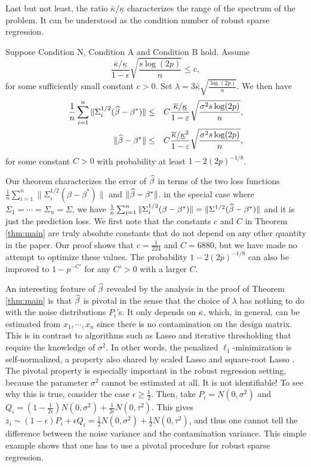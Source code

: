 Last but not least, the ratio $\overline{\kappa}/\underline{\kappa}$ characterizes the range of the spectrum of the problem. It can be understood as the condition number of robust sparse regression.

\begin{thm}\label{thm:main}
Suppose Condition N, Condition A and Condition B hold. Assume
$$\frac{\overline{\kappa}/\underline{\kappa}}{1-\epsilon}\sqrt{\frac{s\log(2p)}{n}}\leq c,$$
for some sufficiently small constant $c>0$. Set $\lambda=3\overline{\kappa}\sqrt{\frac{\log(2p)}{n}}$. We then have
\begin{eqnarray*}
\frac{1}{n}\sum_{i=1}^n\|\Sigma_i^{1/2}(\wh{\beta}-\beta^*)\| &\leq& C\frac{\overline{\kappa}/\underline{\kappa}}{1-\epsilon}\sqrt{\frac{\sigma^2s\log(2p)}{n}}, \\
\|\wh{\beta}-\beta^*\| &\leq& C\frac{\overline{\kappa}/\underline{\kappa}^2}{1-\epsilon}\sqrt{\frac{\sigma^2s\log(2p)}{n}},
\end{eqnarray*}
for some constant $C>0$ with probability at least $1-2(2p)^{-1/8}$.
\end{thm}

Our theorem characterizes the error of $\widehat{\beta}$ in terms of the two loss functions $\frac{1}{n}\sum_{i=1}^n\|\Sigma_i^{1/2}(\beta-\beta^*)\|$ and $\|\widehat{\beta}-\beta^*\|$. in the special case where $\Sigma_1=\cdots=\Sigma_n=\Sigma$, we have $\frac{1}{n}\sum_{i=1}^n\|\Sigma_i^{1/2}(\beta-\beta^*)\|=\|\Sigma^{1/2}(\widehat{\beta}-\beta^*)\|$ and it is just the prediction loss. We first note that the constants $c$ and $C$ in Theorem \ref{thm:main} are truly absolute constants that do not depend on any other quantity in the paper. Our proof shows that $c=\frac{1}{224}$ and $C=6880$, but we have made no attempt to optimize these values. The probability $1-2(2p)^{-1/8}$ can also be improved to $1-p^{-C'}$ for any $C'>0$ with a larger $C$.

An interesting feature of $\widehat{\beta}$ revealed by the analysis in the proof of Theorem \ref{thm:main} is that $\widehat{\beta}$ is pivotal in the sense that the choice of $\lambda$ has nothing to do with the noise distributions $P_i$'s. It only depends on $\overline{\kappa}$, which, in general, can be estimated from $x_1,\cdots, x_n$ since there is no contamination on the design matrix. This is in contrast to algorithms such as Lasso \citep{bickel2009simultaneous} and iterative thresholding \citep{suggala2019adaptive} that require the knowledge of $\sigma^2$. In other words, the penalized $\ell_1$-minimization is self-normalized, a property also shared by scaled Lasso \citep{sun2012scaled} and square-root Lasso \citep{belloni2011square}. The pivotal property is especially important in the robust regression setting, because the parameter $\sigma^2$ cannot be estimated at all. It is not identifiable! To see why this is true, consider the case $\epsilon\geq \frac{1}{2}$. Then, take $P_i=N(0,\sigma^2)$ and $Q_i=\left(1-\frac{1}{2\epsilon}\right)N(0,\sigma^2)+\frac{1}{2\epsilon}N(0,\tau^2)$. This gives $z_i\sim (1-\epsilon)P_i+\epsilon Q_i = \frac{1}{2}N(0,\sigma^2)+\frac{1}{2}N(0,\tau^2)$,
and thus one cannot tell the difference between the noise variance and the contamination variance. This simple example shows that one has to use a pivotal procedure for robust sparse regression.

